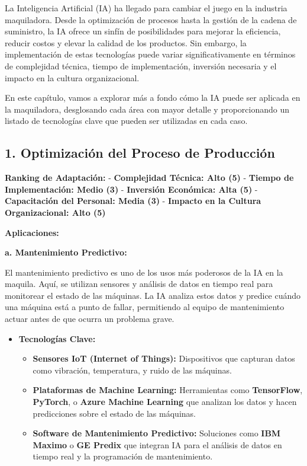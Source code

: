 \documentclass[
  letterpaper,
]{book}
\providecommand{\tightlist}{%
  \setlength{\itemsep}{0pt}\setlength{\parskip}{0pt}}\usepackage{longtable,booktabs,array}
\begin{document}
La Inteligencia Artificial (IA) ha llegado para cambiar el juego en la
industria maquiladora. Desde la optimización de procesos hasta la
gestión de la cadena de suministro, la IA ofrece un sinfín de
posibilidades para mejorar la eficiencia, reducir costos y elevar la
calidad de los productos. Sin embargo, la implementación de estas
tecnologías puede variar significativamente en términos de complejidad
técnica, tiempo de implementación, inversión necesaria y el impacto en
la cultura organizacional.

En este capítulo, vamos a explorar más a fondo cómo la IA puede ser
aplicada en la maquiladora, desglosando cada área con mayor detalle y
proporcionando un listado de tecnologías clave que pueden ser utilizadas
en cada caso.

\subsection{\texorpdfstring{1. \textbf{Optimización del Proceso de
Producción}}{1. Optimización del Proceso de Producción}}\label{optimizaciuxf3n-del-proceso-de-producciuxf3n}

\textbf{Ranking de Adaptación:} - \textbf{Complejidad Técnica: Alto (5)}
- \textbf{Tiempo de Implementación: Medio (3)} - \textbf{Inversión
Económica: Alta (5)} - \textbf{Capacitación del Personal: Media (3)} -
\textbf{Impacto en la Cultura Organizacional: Alto (5)}

\textbf{Aplicaciones:}

\textbf{a. Mantenimiento Predictivo:}

El mantenimiento predictivo es uno de los usos más poderosos de la IA en
la maquila. Aquí, se utilizan sensores y análisis de datos en tiempo
real para monitorear el estado de las máquinas. La IA analiza estos
datos y predice cuándo una máquina está a punto de fallar, permitiendo
al equipo de mantenimiento actuar antes de que ocurra un problema grave.

\begin{itemize}
\tightlist
\item
  \textbf{Tecnologías Clave:}

  \begin{itemize}
  \tightlist
  \item
    \textbf{Sensores IoT (Internet of Things):} Dispositivos que
    capturan datos como vibración, temperatura, y ruido de las máquinas.
  \item
    \textbf{Plataformas de Machine Learning:} Herramientas como
    \textbf{TensorFlow}, \textbf{PyTorch}, o \textbf{Azure Machine
    Learning} que analizan los datos y hacen predicciones sobre el
    estado de las máquinas.
  \item
    \textbf{Software de Mantenimiento Predictivo:} Soluciones como
    \textbf{IBM Maximo} o \textbf{GE Predix} que integran IA para el
    análisis de datos en tiempo real y la programación de mantenimiento.
  \end{itemize}
\end{itemize}
\end{document}
